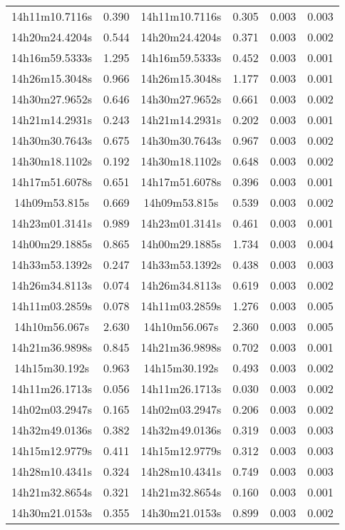 \begin{table}
\begin{tabular}{cccccc}
14h11m10.7116s & 0.390 & 14h11m10.7116s & 0.305 & 0.003 & 0.003 \\
14h20m24.4204s & 0.544 & 14h20m24.4204s & 0.371 & 0.003 & 0.002 \\
14h16m59.5333s & 1.295 & 14h16m59.5333s & 0.452 & 0.003 & 0.001 \\
14h26m15.3048s & 0.966 & 14h26m15.3048s & 1.177 & 0.003 & 0.001 \\
14h30m27.9652s & 0.646 & 14h30m27.9652s & 0.661 & 0.003 & 0.002 \\
14h21m14.2931s & 0.243 & 14h21m14.2931s & 0.202 & 0.003 & 0.001 \\
14h30m30.7643s & 0.675 & 14h30m30.7643s & 0.967 & 0.003 & 0.002 \\
14h30m18.1102s & 0.192 & 14h30m18.1102s & 0.648 & 0.003 & 0.002 \\
14h17m51.6078s & 0.651 & 14h17m51.6078s & 0.396 & 0.003 & 0.001 \\
14h09m53.815s & 0.669 & 14h09m53.815s & 0.539 & 0.003 & 0.002 \\
14h23m01.3141s & 0.989 & 14h23m01.3141s & 0.461 & 0.003 & 0.001 \\
14h00m29.1885s & 0.865 & 14h00m29.1885s & 1.734 & 0.003 & 0.004 \\
14h33m53.1392s & 0.247 & 14h33m53.1392s & 0.438 & 0.003 & 0.003 \\
14h26m34.8113s & 0.074 & 14h26m34.8113s & 0.619 & 0.003 & 0.002 \\
14h11m03.2859s & 0.078 & 14h11m03.2859s & 1.276 & 0.003 & 0.005 \\
14h10m56.067s & 2.630 & 14h10m56.067s & 2.360 & 0.003 & 0.005 \\
14h21m36.9898s & 0.845 & 14h21m36.9898s & 0.702 & 0.003 & 0.001 \\
14h15m30.192s & 0.963 & 14h15m30.192s & 0.493 & 0.003 & 0.002 \\
14h11m26.1713s & 0.056 & 14h11m26.1713s & 0.030 & 0.003 & 0.002 \\
14h02m03.2947s & 0.165 & 14h02m03.2947s & 0.206 & 0.003 & 0.002 \\
14h32m49.0136s & 0.382 & 14h32m49.0136s & 0.319 & 0.003 & 0.003 \\
14h15m12.9779s & 0.411 & 14h15m12.9779s & 0.312 & 0.003 & 0.003 \\
14h28m10.4341s & 0.324 & 14h28m10.4341s & 0.749 & 0.003 & 0.003 \\
14h21m32.8654s & 0.321 & 14h21m32.8654s & 0.160 & 0.003 & 0.001 \\
14h30m21.0153s & 0.355 & 14h30m21.0153s & 0.899 & 0.003 & 0.002 \\

\end{tabular}
\end{table}
